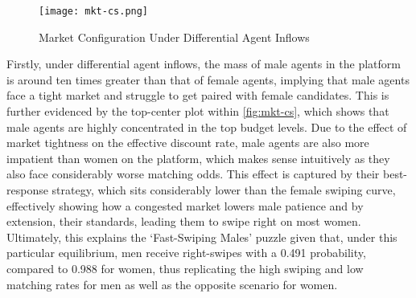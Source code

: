 \begin{figure}[ht]
    \centering
    \caption{Market Configuration Under Differential Agent Inflows}
    \texttt{[image: mkt-cs.png]}
    \label{fig:mkt-cs} 
\end{figure} 

Firstly, under differential agent inflows, the mass of male agents in the platform is around ten times greater than that of female agents, implying that male agents face a tight market and struggle to get paired with female candidates. This is further evidenced by the top-center plot within \autoref{fig:mkt-cs}, which shows that male agents are highly concentrated in the top budget levels. Due to the effect of market tightness on the effective discount rate, male agents are also more impatient than women on the platform, which makes sense intuitively as they also face considerably worse matching odds. This effect is captured by their best-response strategy, which sits considerably lower than the female swiping curve, effectively showing how a congested market lowers male patience and by extension, their standards, leading them to swipe right on most women. Ultimately, this explains the `Fast-Swiping Males' puzzle given that, under this particular equilibrium, men receive right-swipes with a 0.491 probability, compared to 0.988 for women, thus replicating the high swiping and low matching rates for men as well as the opposite scenario for women.